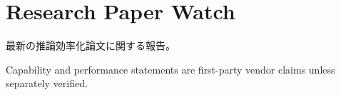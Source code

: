 \section{Research Paper Watch}
最新の推論効率化論文に関する報告。
\begin{claimboundary}
Capability and performance statements are first-party vendor claims unless separately verified.
\end{claimboundary}
